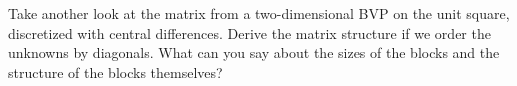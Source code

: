   Take another look at the matrix from a two-dimensional \ac{BVP} on
  the unit square,
  discretized with central differences.
  Derive the matrix structure if we
  order the unknowns by diagonals. What can you say about the sizes of
  the blocks and the structure of the blocks themselves?
